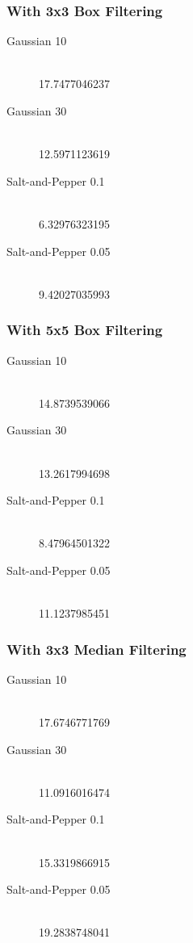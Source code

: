 \documentclass{article}
\begin{document}
\subsubsection{With 3x3 Box Filtering}
\begin{description}
  \item[Gaussian 10] \hfill \\
  17.7477046237
  \item[Gaussian 30] \hfill \\
  12.5971123619
  \item[Salt-and-Pepper 0.1] \hfill \\
  6.32976323195
  \item[Salt-and-Pepper 0.05] \hfill \\
  9.42027035993
\end{description}

\subsubsection{With 5x5 Box Filtering}
\begin{description}
  \item[Gaussian 10] \hfill \\
  14.8739539066
  \item[Gaussian 30] \hfill \\
  13.2617994698
  \item[Salt-and-Pepper 0.1] \hfill \\
  8.47964501322
  \item[Salt-and-Pepper 0.05] \hfill \\
  11.1237985451
\end{description}

\subsubsection{With 3x3 Median Filtering}
\begin{description}
  \item[Gaussian 10] \hfill \\
  17.6746771769
  \item[Gaussian 30] \hfill \\
  11.0916016474
  \item[Salt-and-Pepper 0.1] \hfill \\
  15.3319866915
  \item[Salt-and-Pepper 0.05] \hfill \\
  19.2838748041
\end{description}
\end{document}
